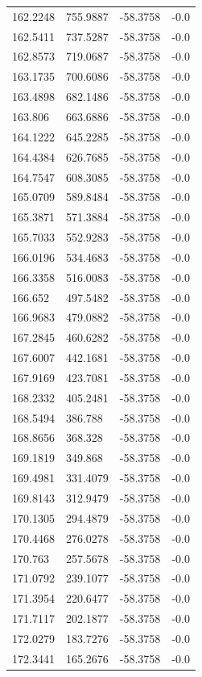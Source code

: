 \begin{table}[H]
\begin{tabular}{llll}
162.2248 & 755.9887 & -58.3758 & -0.0 \\
162.5411 & 737.5287 & -58.3758 & -0.0 \\
162.8573 & 719.0687 & -58.3758 & -0.0 \\
163.1735 & 700.6086 & -58.3758 & -0.0 \\
163.4898 & 682.1486 & -58.3758 & -0.0 \\
163.806 & 663.6886 & -58.3758 & -0.0 \\
164.1222 & 645.2285 & -58.3758 & -0.0 \\
164.4384 & 626.7685 & -58.3758 & -0.0 \\
164.7547 & 608.3085 & -58.3758 & -0.0 \\
165.0709 & 589.8484 & -58.3758 & -0.0 \\
165.3871 & 571.3884 & -58.3758 & -0.0 \\
165.7033 & 552.9283 & -58.3758 & -0.0 \\
166.0196 & 534.4683 & -58.3758 & -0.0 \\
166.3358 & 516.0083 & -58.3758 & -0.0 \\
166.652 & 497.5482 & -58.3758 & -0.0 \\
166.9683 & 479.0882 & -58.3758 & -0.0 \\
167.2845 & 460.6282 & -58.3758 & -0.0 \\
167.6007 & 442.1681 & -58.3758 & -0.0 \\
167.9169 & 423.7081 & -58.3758 & -0.0 \\
168.2332 & 405.2481 & -58.3758 & -0.0 \\
168.5494 & 386.788 & -58.3758 & -0.0 \\
168.8656 & 368.328 & -58.3758 & -0.0 \\
169.1819 & 349.868 & -58.3758 & -0.0 \\
169.4981 & 331.4079 & -58.3758 & -0.0 \\
169.8143 & 312.9479 & -58.3758 & -0.0 \\
170.1305 & 294.4879 & -58.3758 & -0.0 \\
170.4468 & 276.0278 & -58.3758 & -0.0 \\
170.763 & 257.5678 & -58.3758 & -0.0 \\
171.0792 & 239.1077 & -58.3758 & -0.0 \\
171.3954 & 220.6477 & -58.3758 & -0.0 \\
171.7117 & 202.1877 & -58.3758 & -0.0 \\
172.0279 & 183.7276 & -58.3758 & -0.0 \\
172.3441 & 165.2676 & -58.3758 & -0.0 \\

\end{tabular}
\end{table}
